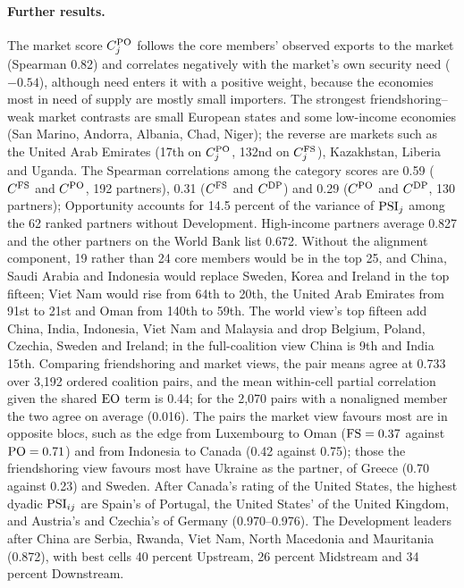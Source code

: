 \paragraph{Further results.} The market score $C^{\mathrm{PO}}_j$ follows the core members' observed exports
to the market (Spearman 0.82) and correlates negatively with the market's own security need
($-0.54$), although need enters it with a positive weight, because the economies most in need of
supply are mostly small importers. The strongest friendshoring--weak market contrasts are small European
states and some low-income economies (San Marino, Andorra, Albania, Chad, Niger); the reverse are
markets such as the United Arab Emirates (17th on $C^{\mathrm{PO}}_j$, 132nd on $C^{\mathrm{FS}}_j$), Kazakhstan,
Liberia and Uganda. The Spearman correlations among the category scores are 0.59 ($C^{\mathrm{FS}}$ and
$C^{\mathrm{PO}}$, 192 partners), 0.31 ($C^{\mathrm{FS}}$ and $C^{\mathrm{DP}}$) and 0.29 ($C^{\mathrm{PO}}$ and $C^{\mathrm{DP}}$, 130
partners); Opportunity accounts for 14.5 percent of the variance of $\mathrm{PSI}_j$ among the 62 ranked
partners without Development. High-income partners average 0.827 and the other partners on the
World Bank list 0.672. Without the alignment component, 19 rather than 24 core members would be in
the top 25, and China, Saudi Arabia and Indonesia would replace Sweden, Korea and Ireland in the top
fifteen; Viet Nam would rise from 64th to 20th, the United Arab Emirates from 91st to 21st and Oman
from 140th to 59th. The world view's top fifteen add China, India, Indonesia, Viet Nam and Malaysia
and drop Belgium, Poland, Czechia, Sweden and Ireland; in the full-coalition view China is 9th and
India 15th. Comparing friendshoring and market views, the pair means agree at 0.733 over 3,192 ordered
coalition pairs, and the mean within-cell partial correlation given the shared $\mathrm{EO}$ term is
0.44; for the 2,070 pairs with a nonaligned member the two agree on average (0.016). The pairs the
market view favours most are in opposite blocs, such as the edge from Luxembourg to Oman ($\mathrm{FS}=0.37$
against $\mathrm{PO}=0.71$) and from Indonesia to Canada (0.42 against 0.75); those the friendshoring view
favours most have Ukraine as the partner, of Greece (0.70 against 0.23) and Sweden. After Canada's
rating of the United States, the highest dyadic $\mathrm{PSI}_{ij}$ are Spain's of Portugal, the United
States' of the United Kingdom, and Austria's and Czechia's of Germany (0.970--0.976). The Development
leaders after China are Serbia, Rwanda, Viet Nam, North Macedonia and Mauritania (0.872), with best
cells 40 percent Upstream, 26 percent Midstream and 34 percent Downstream.
